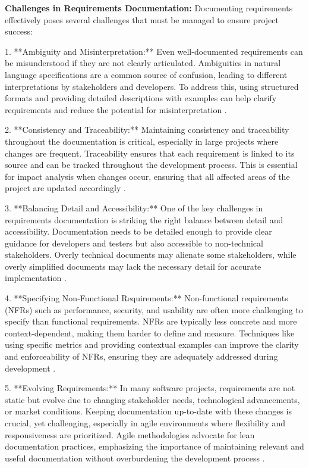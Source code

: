 \begin{refsection}
\textbf{Challenges in Requirements Documentation:} Documenting requirements effectively poses several challenges that must be managed to ensure project success:

1. **Ambiguity and Misinterpretation:** Even well-documented requirements can be misunderstood if they are not clearly articulated. Ambiguities in natural language specifications are a common source of confusion, leading to different interpretations by stakeholders and developers. To address this, using structured formats and providing detailed descriptions with examples can help clarify requirements and reduce the potential for misinterpretation \cite[pp.~35-58]{wiegers2013software}.

2. **Consistency and Traceability:** Maintaining consistency and traceability throughout the documentation is critical, especially in large projects where changes are frequent. Traceability ensures that each requirement is linked to its source and can be tracked throughout the development process. This is essential for impact analysis when changes occur, ensuring that all affected areas of the project are updated accordingly \cite[pp.~85-100]{sommerville2016software}.

3. **Balancing Detail and Accessibility:** One of the key challenges in requirements documentation is striking the right balance between detail and accessibility. Documentation needs to be detailed enough to provide clear guidance for developers and testers but also accessible to non-technical stakeholders. Overly technical documents may alienate some stakeholders, while overly simplified documents may lack the necessary detail for accurate implementation \cite[pp.~200-215]{cockburn2007agile}.

4. **Specifying Non-Functional Requirements:** Non-functional requirements (NFRs) such as performance, security, and usability are often more challenging to specify than functional requirements. NFRs are typically less concrete and more context-dependent, making them harder to define and measure. Techniques like using specific metrics and providing contextual examples can improve the clarity and enforceability of NFRs, ensuring they are adequately addressed during development \cite[pp.~15-33]{chung2000nonfunctional}.

5. **Evolving Requirements:** In many software projects, requirements are not static but evolve due to changing stakeholder needs, technological advancements, or market conditions. Keeping documentation up-to-date with these changes is crucial, yet challenging, especially in agile environments where flexibility and responsiveness are prioritized. Agile methodologies advocate for lean documentation practices, emphasizing the importance of maintaining relevant and useful documentation without overburdening the development process \cite[pp.~200-215]{cockburn2007agile}.


\end{refsection}
